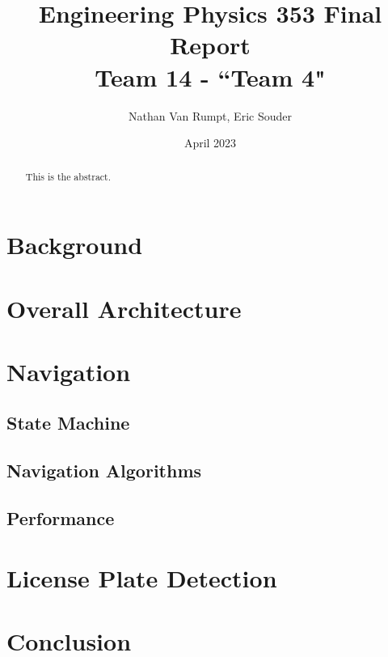 \documentclass[titlepage, twocolumn]{article}
\title{%
    Engineering Physics 353 Final Report \\
    \large Team 14 - ``Team 4"}
\author{Nathan Van Rumpt, Eric Souder}
\date{April 2023}
\begin{document}
\maketitle

\begin{abstract}
    This is the abstract.
\end{abstract}

\section{Background}

\section{Overall Architecture}

\section{Navigation}

    \subsection{State Machine}
    \subsection{Navigation Algorithms}
    \subsection{Performance}

\section{License Plate Detection}

\section{Conclusion}
\end{document}
